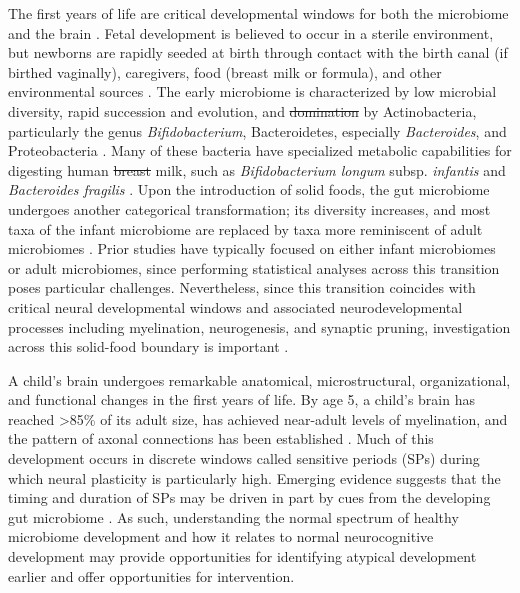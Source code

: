 \documentclass{article}
\providecommand{\DIFadd}[1]{{\protect\color{blue}\uwave{#1}}} %
\providecommand{\DIFdel}[1]{{\protect\color{red}\sout{#1}}}                      %
\providecommand{\DIFaddbegin}{} %
\providecommand{\DIFaddend}{} %
\providecommand{\DIFdelbegin}{} %
\providecommand{\DIFdelend}{} %
\newcommand{\DIFscaledelfig}{0.5}
\newlength{\DIFdelgraphicswidth} %
\newlength{\DIFdelgraphicsheight} %
\newcommand{\DIFaddincludegraphics}[2][]{{\color{blue}\fbox{\DIFOincludegraphics[#1]{#2}}}} %
\newcommand{\DIFdelincludegraphics}[2][]{%
\sbox{\DIFdelgraphicsbox}{\DIFOincludegraphics[#1]{#2}}%
\settoboxwidth{\DIFdelgraphicswidth}{\DIFdelgraphicsbox} %
\settoboxtotalheight{\DIFdelgraphicsheight}{\DIFdelgraphicsbox} %
\scalebox{\DIFscaledelfig}{%
\parbox[b]{\DIFdelgraphicswidth}{\usebox{\DIFdelgraphicsbox}\\[-\baselineskip] \rule{\DIFdelgraphicswidth}{0em}}\llap{\resizebox{\DIFdelgraphicswidth}{\DIFdelgraphicsheight}{%
\setlength{\unitlength}{\DIFdelgraphicswidth}%
\begin{picture}(1,1)%
\thicklines\linethickness{2pt} %
{\color[rgb]{1,0,0}\put(0,0){\framebox(1,1){}}}%
{\color[rgb]{1,0,0}\put(0,0){\line( 1,1){1}}}%
{\color[rgb]{1,0,0}\put(0,1){\line(1,-1){1}}}%
\end{picture}%
}\hspace*{3pt}}} %
} %
\DeclareRobustCommand{\DIFaddbegin}{\DIFOaddbegin \let\includegraphics\DIFaddincludegraphics} %
\DeclareRobustCommand{\DIFaddend}{\DIFOaddend \let\includegraphics\DIFOincludegraphics} %
\DeclareRobustCommand{\DIFdelbegin}{\DIFOdelbegin \let\includegraphics\DIFdelincludegraphics} %
\DeclareRobustCommand{\DIFdelend}{\DIFOaddend \let\includegraphics\DIFOincludegraphics} %
\begin{document}
The first years of life are critical developmental windows for both the
microbiome and the brain
\cite{laueDevelopingMicrobiomeBirth2022}.
Fetal development is believed to occur in a sterile environment, but newborns
are rapidly seeded at birth through contact with the birth canal (if
birthed vaginally), caregivers, food (breast milk or formula),
and other environmental sources
\cite{backhedDynamicsStabilizationHuman2015,bokulichAntibioticsBirthMode2016}.
The early microbiome is characterized by low microbial
diversity, rapid succession and evolution, and \DIFdelbegin \DIFdel{domination }\DIFdelend \DIFaddbegin \DIFadd{is dominated }\DIFaddend by
Actinobacteria, particularly the genus \emph{Bifidobacterium},
Bacteroidetes, especially \emph{Bacteroides}, and Proteobacteria
\cite{koenigSuccessionMicrobialConsortia2011}.
Many of these bacteria have specialized metabolic capabilities
for digesting human \DIFdelbegin \DIFdel{breast }\DIFdelend milk, such as \emph{Bifidobacterium longum}
subsp. \textit{infantis} and \emph{Bacteroides fragilis}
\cite{selaGenomeSequenceBifidobacterium2008}.
Upon the introduction of solid foods, the gut
microbiome undergoes another categorical transformation;
its diversity increases, and most taxa of the infant microbiome
are replaced by taxa more reminiscent of adult microbiomes
\cite{backhedDynamicsStabilizationHuman2015}.
Prior studies have typically focused on either infant microbiomes or
adult microbiomes, since performing statistical analyses across this
transition poses particular challenges. Nevertheless, since this
transition coincides with critical neural developmental windows and
associated neurodevelopmental processes including myelination, neurogenesis, and synaptic pruning,
investigation across this solid-food boundary is important
\cite{tauNormalDevelopmentBrain2010}.

A child's brain undergoes remarkable anatomical, microstructural,
organizational, and functional changes in the first years of life. By
age 5, a child's brain has reached \textgreater85\% of its adult size,
has achieved near-adult levels of myelination, and the pattern of axonal
connections has been established
\cite{silbereisCellularMolecularLandscapes2016}.
Much of this development occurs in discrete windows called
sensitive periods (SPs)
\cite{knudsenSensitivePeriodsDevelopment2004}
during which neural plasticity is particularly high.
Emerging evidence suggests that the timing and duration of SPs
may be driven in part by cues from the developing gut microbiome
\cite{callaghanNestedSensitivePeriods2020,cowanAnnualResearchReview2020}.
As such, understanding the normal spectrum of healthy microbiome
development and how it relates to normal neurocognitive development may
provide opportunities for identifying atypical development earlier and
offer opportunities for intervention.
\end{document}
